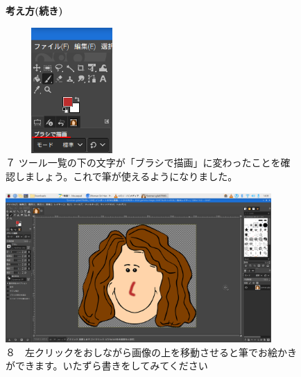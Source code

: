 \documentclass[a4paper,12pt]{jarticle}
\begin{document}
\begin{figure}[ht]
  \textbf{考え方(続き)}

  \begin{minipage}{\textwidth}
    \centering
    \begin{minipage}{5.76cm}
      \includegraphics[width=5.05cm,height=4.796cm]{textbook-img130.png}\\
      ７
      ツール一覧の下の文字が「ブラシで描画」に変わったことを確認しましょう。これで筆が使えるようになりました。
    \end{minipage}
    \hfill
    \begin{minipage}{10.2cm}
      \includegraphics[width=10.134cm,height=5.697cm]{textbook-img131.png}\\
      ８　左クリックをおしながら画像の上を移動させると筆でお絵かきができます。いたずら書きをしてみてください
    \end{minipage}
  \end{minipage}


  \bigskip


\end{figure}
\end{document}
